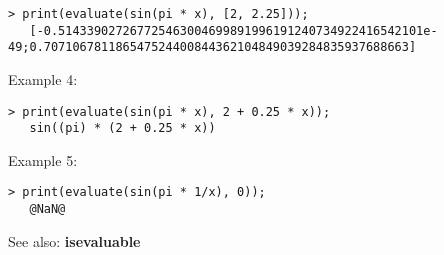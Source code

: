 \begin{center}\begin{minipage}{14.8cm}\begin{Verbatim}[frame=single]
   > print(evaluate(sin(pi * x), [2, 2.25]));
   [-0.514339027267725463004699891996191240734922416542101e-49;0.707106781186547524400844362104849039284835937688663]
\end{Verbatim}
\end{minipage}\end{center}
\noindent Example 4: 
\begin{center}\begin{minipage}{14.8cm}\begin{Verbatim}[frame=single]
   > print(evaluate(sin(pi * x), 2 + 0.25 * x));
   sin((pi) * (2 + 0.25 * x))
\end{Verbatim}
\end{minipage}\end{center}
\noindent Example 5: 
\begin{center}\begin{minipage}{14.8cm}\begin{Verbatim}[frame=single]
   > print(evaluate(sin(pi * 1/x), 0));
   @NaN@
\end{Verbatim}
\end{minipage}\end{center}
See also: \textbf{isevaluable}
